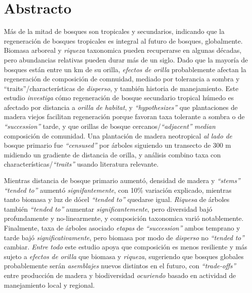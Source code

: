 \documentclass[
  12pt,
]{article}
\begin{document}
\newpage

\hypertarget{abstracto}{%
\section*{Abstracto}\label{abstracto}}

Más de la mitad de bosques son tropicales y secundarios, indicando que la regeneración de bosques tropicales es integral al futuro de bosques, globalmente.
Biomasa arboreal y \emph{riqueza} taxonomica pueden recuperarse en algunas décadas, pero abundancias relativas pueden durar más de un siglo.
Dado que la mayoría de bosques están entre un km de su orilla, \emph{efectos de orilla} probablemente afectan la regeneración de composición de comnuidad, mediado por tolerancia a sombra y ``traits''/characterísticas de \emph{disperso}, y también historia de manejamiento.
Este estudio \emph{investiga} cómo regeneración de bosque secundario tropical húmedo es afectado por distancia a \emph{orilla de habitat}, y \emph{``hypothesizes''} que plantaciones de madera viejos facilitan regeneración porque favoran taxa tolerante a sombra o de \emph{``succession''} tarde, y que orillas de bosque cercanos/\emph{``adjacent''} \emph{median} composición de comunidad.
Una plantación de madera neotropical \emph{al lado de} bosque primario fue \emph{``censused''} por árboles siguiendo un transecto de 300 m midiendo un gradiente de distancia de orilla, y análisis combino taxa con characterísticas/\emph{``traits''} usando literatura relevante.

Mientras distancia de bosque primario aumentó, densidad de madera y \emph{``stems''} \emph{``tended to''} aumentó \emph{signifantemente}, con 10\% variación explicado, mientras tanto biomasa y luz de dócel \emph{``tended to''} quedarse igual.
\emph{Riquesa} de árboles también \emph{``tended to''} aumentar \emph{significantemente}, pero diversidad bajó profundamente y no-linearmente, y composición taxonomica varió notablemente.
Finalmente, taxa de árboles asociado \emph{etapas} de \emph{``succession''} ambos temprano y tarde bajó \emph{significativamente}, pero biomasa por modo de \emph{disperso} no \emph{``tended to''} cambiar.
\emph{Entre todo} este estudio apoya que composición es menos resiliente y más sujeto a \emph{efectos de orilla} que biomasa y \emph{riqueza}, sugeriendo que bosques globales probablemente serán \emph{asemblajes} nuevos distintos en el futuro, con \emph{``trade-offs''} entre producción de madera y biodiversidad \emph{ocuriendo} basado en actividad de manejamiento local y regional.
\end{document}

